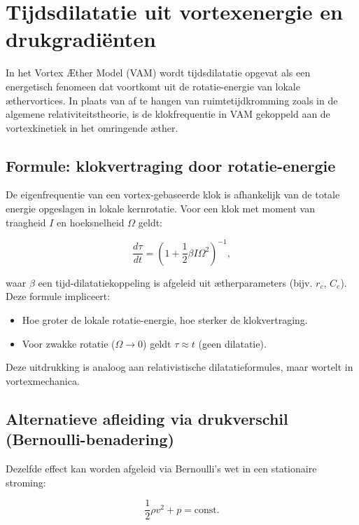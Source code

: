 
\section{Tijdsdilatatie uit vortexenergie en drukgradiënten}

In het Vortex Æther Model (VAM) wordt tijdsdilatatie opgevat als een energetisch fenomeen dat voortkomt uit de rotatie-energie van lokale æthervortices. In plaats van af te hangen van ruimtetijdkromming zoals in de algemene relativiteitstheorie, is de klokfrequentie in VAM gekoppeld aan de vortexkinetiek in het omringende æther.

\subsection{Formule: klokvertraging door rotatie-energie}

De eigenfrequentie van een vortex-gebaseerde klok is afhankelijk van de totale energie opgeslagen in lokale kernrotatie. Voor een klok met moment van traagheid $I$ en hoeksnelheid $\Omega$ geldt:

\begin{equation}
\frac{d\tau}{dt} = \left(1 + \frac{1}{2} \beta I \Omega^2 \right)^{-1},
\end{equation}

waar $\beta$ een tijd-dilatatiekoppeling is afgeleid uit ætherparameters (bijv. $r_c$, $C_e$). Deze formule impliceert:

\begin{itemize}
    \item Hoe groter de lokale rotatie-energie, hoe sterker de klokvertraging.
    \item Voor zwakke rotatie ($\Omega \to 0$) geldt $\tau \approx t$ (geen dilatatie).
\end{itemize}

Deze uitdrukking is analoog aan relativistische dilatatieformules, maar wortelt in vortexmechanica.

\subsection{Alternatieve afleiding via drukverschil (Bernoulli-benadering)}

Dezelfde effect kan worden afgeleid via Bernoulli’s wet in een stationaire stroming:

\begin{equation}
\frac{1}{2} \rho v^2 + p = \text{const.}
\end{equation}

